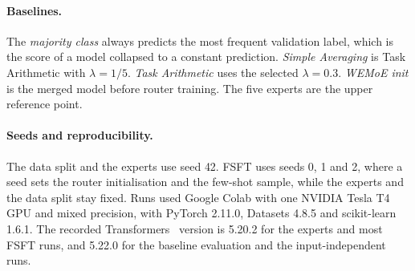 \paragraph{Baselines.} The \emph{majority class} always predicts the most frequent validation label, which is the score of a model collapsed to a constant prediction. \emph{Simple Averaging} is Task Arithmetic with $\lambda=1/5$. \emph{Task Arithmetic} uses the selected $\lambda=0.3$. \emph{WEMoE init} is the merged model before router training. The five experts are the upper reference point.

\paragraph{Seeds and reproducibility.} The data split and the experts use seed 42. FSFT uses seeds 0, 1 and 2, where a seed sets the router initialisation and the few-shot sample, while the experts and the data split stay fixed. Runs used Google Colab with one NVIDIA Tesla T4 GPU and mixed precision, with PyTorch 2.11.0, Datasets 4.8.5 and scikit-learn 1.6.1. The recorded Transformers~\cite{wolf2020transformers} version is 5.20.2 for the experts and most FSFT runs, and 5.22.0 for the baseline evaluation and the input-independent runs.
